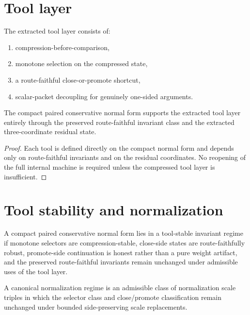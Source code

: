 \section{Tool layer}
\begin{definition}\label{def:tool-layer}
The extracted tool layer consists of:
\begin{enumerate}[leftmargin=2em]
 \item compression-before-comparison,
 \item monotone selection on the compressed state,
 \item a route-faithful close-or-promote shortcut,
 \item scalar-packet decoupling for genuinely one-sided arguments.
\end{enumerate}
\end{definition}

\begin{theorem}\label{thm:tool-extraction}
The compact paired conservative normal form supports the extracted tool layer entirely through the preserved route-faithful invariant class and the extracted three-coordinate residual state.
\end{theorem}

\begin{proof}
Each tool is defined directly on the compact normal form and depends only on route-faithful invariants and on the residual coordinates. No reopening of the full internal machine is required unless the compressed tool layer is insufficient.
\end{proof}

\section{Tool stability and normalization}
\begin{definition}\label{def:tool-stable-invariant-regime}
A compact paired conservative normal form lies in a tool-stable invariant regime if monotone selectors are compression-stable, close-side states are route-faithfully robust, promote-side continuation is honest rather than a pure weight artifact, and the preserved route-faithful invariants remain unchanged under admissible uses of the tool layer.
\end{definition}

\begin{definition}\label{def:canonical-normalization-regime}
A canonical normalization regime is an admissible class of normalization scale triples in which the selector class and close/promote classification remain unchanged under bounded side-preserving scale replacements.
\end{definition}

